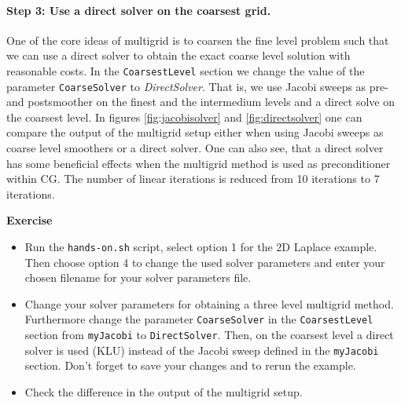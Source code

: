 \documentclass[12pt,a4paper]{article}
\begin{document}
\paragraph{Step 3: Use a direct solver on the coarsest grid.}
One of the core ideas of multigrid is to coarsen the fine level problem such that we can use a direct solver to obtain the exact coarse level solution with reasonable costs. In the \texttt{CoarsestLevel} section we change the value of the parameter \texttt{CoarseSolver} to \textit{DirectSolver}. That is, we use Jacobi sweeps as pre- and postsmoother on the finest and the intermedium levels and a direct solve on the coarsest level.
In figures \ref{fig:jacobisolver} and \ref{fig:directsolver} one can compare the output of the multigrid setup either when using Jacobi sweeps as coarse level smoothers or a direct solver. One can also see, that a direct solver has some beneficial effects when the multigrid method is used as preconditioner within CG. The number of linear iterations is reduced from 10 iterations to 7 iterations.

\begin{graybox}
 \textbf{Exercise}
 \begin{itemize}
  \item Run the \verb|hands-on.sh| script, select option 1 for the 2D Laplace example. Then choose option 4 to change the used solver parameters and enter your chosen filename for your solver parameters file.
  \item Change your solver parameters for obtaining a three level multigrid method. Furthermore change the parameter \verb|CoarseSolver| in the \verb|CoarsestLevel| section from \verb|myJacobi| to \verb|DirectSolver|. Then, on the coarsest level a direct solver is used (KLU) instead of the Jacobi sweep defined in the \verb|myJacobi| section. Don't forget to save your changes and to rerun the example.
  \item Check the difference in the output of the multigrid setup.
 \end{itemize}
\end{graybox}
\end{document}
